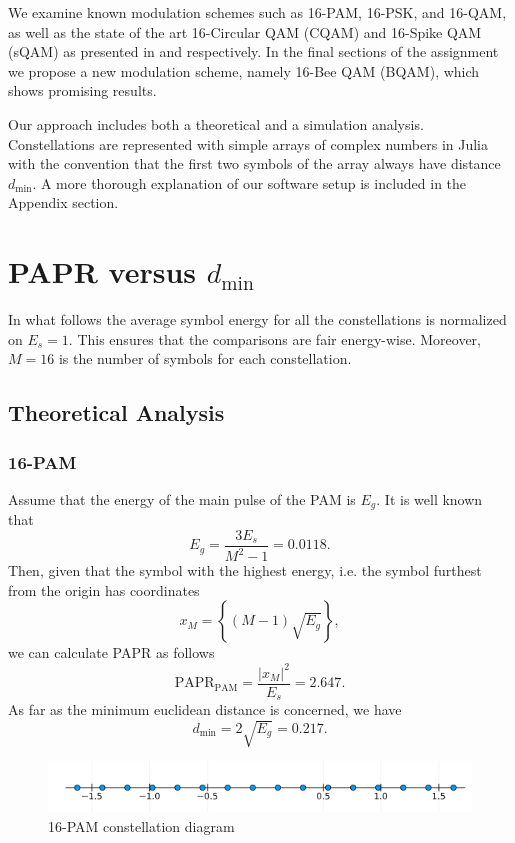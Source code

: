 \documentclass[11pt,a4paper,onecolumn,final]{article}
\begin{document}
We examine known modulation schemes such as 16-PAM, 16-PSK, and 16-QAM, as well as the state of the art 16-Circular QAM (CQAM) and 16-Spike QAM (sQAM) as presented in \cite{cqam} and \cite{sqam} respectively. In the final sections of the assignment we propose a new modulation scheme, namely 16-Bee QAM (BQAM), which shows promising results. 

Our approach includes both a theoretical and a simulation analysis. Constellations are represented with simple arrays of complex numbers in Julia with the convention that the first two symbols of the array always have distance \(d_\text{min}\). A more thorough explanation of our software setup is included in the Appendix section.  


\section{PAPR versus \(d_\text{min}\)}
In what follows the average symbol energy for all the constellations is normalized on \(E_s = 1\). This ensures that the comparisons are fair energy-wise. Moreover, \(M = 16\) is the number of symbols for each constellation. 

\subsection{Theoretical Analysis}
\subsubsection*{16-PAM} 
Assume that the energy of the main pulse of the PAM is \(E_g\). It is well known that 
\begin{equation}
    E_g = \frac{3E_s }{M^2 - 1} = 0.0118. 
\end{equation}
Then, given that the symbol with the highest energy, i.e. the symbol furthest from the origin has coordinates 
\begin{equation}
    x_M = \left\{(M-1)\sqrt{E_g}\right\}, 
\end{equation}
we can calculate PAPR as follows 
\begin{equation}
    \text{PAPR}_\text{PAM} = \frac{|x_M|^2}{E_s} = 2.647.
\end{equation}
As far as the minimum euclidean distance is concerned, we have
\begin{equation}
    d_\text{min} = 2\sqrt{E_g} = 0.217.
\end{equation}

\begin{figure}[h]
    \centering
    \includegraphics[scale=0.7]{16pam.png}
    \caption{16-PAM constellation diagram}
\end{figure}
\end{document}
